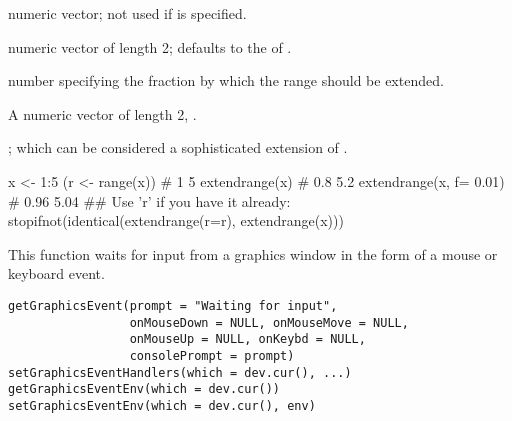 %
\begin{Arguments}
\begin{ldescription}
\item[\code{x}] numeric vector; not used if  is specified.
\item[\code{r}] numeric vector of length 2; defaults to the
 of .
\item[\code{f}] number specifying the fraction by which the range should be
extended.
\end{ldescription}
\end{Arguments}
%
\begin{Value}
A numeric vector of length 2, .
\end{Value}
%
\begin{SeeAlso}\relax
{};  which can be
considered a sophisticated extension of .
\end{SeeAlso}
%
\begin{Examples}
\begin{ExampleCode}
x <- 1:5
(r <- range(x))         # 1    5
extendrange(x)          # 0.8  5.2
extendrange(x, f= 0.01) # 0.96 5.04
## Use 'r' if you have it already:
stopifnot(identical(extendrange(r=r),
                    extendrange(x)))
\end{ExampleCode}
\end{Examples}
%
\begin{Description}\relax
This function waits for input from a graphics window in the
form of a mouse or keyboard event.
\end{Description}
%
\begin{Usage}
\begin{verbatim}
getGraphicsEvent(prompt = "Waiting for input", 
                 onMouseDown = NULL, onMouseMove = NULL,
                 onMouseUp = NULL, onKeybd = NULL,
                 consolePrompt = prompt)
setGraphicsEventHandlers(which = dev.cur(), ...)
getGraphicsEventEnv(which = dev.cur())
setGraphicsEventEnv(which = dev.cur(), env)

\end{verbatim}
\end{Usage}
